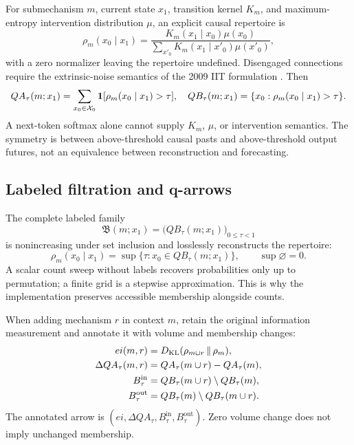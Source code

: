 For submechanism $m$, current state $x_1$, transition kernel $K_m$, and maximum-entropy intervention distribution $\mu$, an explicit causal repertoire is
\begin{equation}
\rho_m(x_0\mid x_1)=
\frac{K_m(x_1\mid x_0)\mu(x_0)}
{\sum_{x'_0}K_m(x_1\mid x'_0)\mu(x'_0)},
\label{eq:causal-repertoire}
\end{equation}
with a zero normalizer leaving the repertoire undefined. Disengaged connections require the extrinsic-noise semantics of the 2009 IIT formulation \cite{iit2009}. Then
\begin{equation}
QA_\tau(m;x_1)=\sum_{x_0\in\mathcal X_0}\mathbf 1[\rho_m(x_0\mid x_1)>\tau],
\quad QB_\tau(m;x_1)=\{x_0:\rho_m(x_0\mid x_1)>\tau\}.
\end{equation}
A next-token softmax alone cannot supply $K_m$, $\mu$, or intervention semantics. The symmetry is between above-threshold causal pasts and above-threshold output futures, not an equivalence between reconstruction and forecasting.

\subsection{Labeled filtration and q-arrows}
The complete labeled family
\begin{equation}
\mathfrak B(m;x_1)=\bigl(QB_\tau(m;x_1)\bigr)_{0\leq\tau<1}
\end{equation}
is nonincreasing under set inclusion and losslessly reconstructs the repertoire:
\begin{equation}
\rho_m(x_0\mid x_1)=
\sup\{\tau:x_0\in QB_\tau(m;x_1)\},\qquad \sup\varnothing=0.
\label{eq:filtration-reconstruction}
\end{equation}
A scalar count sweep without labels recovers probabilities only up to permutation; a finite grid is a stepwise approximation. This is why the implementation preserves accessible membership alongside counts.

When adding mechanism $r$ in context $m$, retain the original information measurement and annotate it with volume and membership changes:
\begin{align}
ei(m,r)&=D_{\mathrm{KL}}(\rho_{m\cup r}\,\|\,\rho_m),\\
\Delta QA_\tau(m,r)&=QA_\tau(m\cup r)-QA_\tau(m),\\
B^{\mathrm{in}}_\tau&=QB_\tau(m\cup r)\setminus QB_\tau(m),\\
B^{\mathrm{out}}_\tau&=QB_\tau(m)\setminus QB_\tau(m\cup r).
\end{align}
The annotated arrow is $(ei,\Delta QA_\tau,B^{\mathrm{in}}_\tau,B^{\mathrm{out}}_\tau)$. Zero volume change does not imply unchanged membership.

